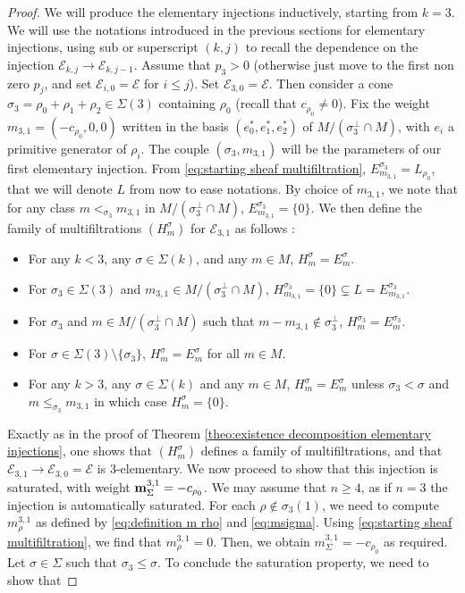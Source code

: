 \documentclass[a4paper,10pt]{amsart}
\theoremstyle{plain}{
    \newtheorem{theorem}{Theorem}[section]
    \newtheorem{lemma}[theorem]{Lemma}
    \newtheorem{corollary}[theorem]{Corollary}
    \newtheorem{proposition}[theorem]{Proposition}
    \newtheorem{conjecture}[theorem]{Conjecture}
}
\theoremstyle{definition}{
    \newtheorem{definition}[theorem]{Definition}
    \newtheorem{defn-thm}[theorem]{Definition-Theorem}
    \newtheorem{example}[theorem]{Example}
    \newtheorem{notation}[theorem]{Notation}
}
\theoremstyle{remark}{
    \newtheorem{remark}[theorem]{Remark}
    \newtheorem{problem}[theorem]{Problem}
    \newtheorem{question}[theorem]{Question}
}
\def\um{{\bf m}}
\def\cE{\mathcal{E}}
\begin{document}
\begin{proof}
We will produce the elementary injections inductively, starting from $k=3$. We will use the notations introduced in the previous sections for elementary injections, using sub or superscript $(k,j)$ to recall the dependence on the injection $\cE_{k,j} \to \cE_{k,j-1}$. Assume that $p_3 > 0$ (otherwise just move to the first non zero $p_j$, and set $\cE_{i,0}=\cE$ for $i\leq j$). Set $\cE_{3,0}=\cE$. Then consider a cone $\sigma_3=\rho_0+\rho_1+\rho_2\in\Sigma(3)$ containing $\rho_0$ (recall that $c_{\rho_0}\neq 0$). Fix the weight $m_{3,1}=(-c_{\rho_0},0,0)$ written in the basis $(e_0^*,e_1^*,e_2^*)$ of $M/(\sigma_3^\perp\cap M)$, with $e_i$ a primitive generator of $\rho_i$. The couple $(\sigma_3,m_{3,1})$ will be the parameters of our first elementary injection. From \eqref{eq:starting sheaf multifiltration}, $E^{\sigma_3}_{m_{3,1}}=L_{\rho_0}$, that we will denote $L$ from now to ease notations. By choice of $m_{3,1}$, we note that for any class $m<_{\sigma_3} m_{3,1}$ in $M/(\sigma_3^\perp\cap M)$, $E^{\sigma_3}_{m_{3,1}}=\lbrace 0\rbrace$. We then define the family of multifiltrations $(H^\sigma_m)$ for $\cE_{3,1}$ as follows :
\begin{itemize}
  \item For any $k<3$, any $\sigma\in\Sigma(k)$, and any $m\in M$, $H^\sigma_m=E^\sigma_m$.
  \item For $\sigma_3\in\Sigma(3)$ and $m_{3,1}\in M/(\sigma_3^\perp\cap M)$, $ H^{\sigma_3}_{m_{3,1}}=\lbrace 0\rbrace\subsetneq L=E^{\sigma_3}_{m_{3,1}}$.
  \item For $\sigma_3$ and $m\in M/(\sigma_3^\perp\cap M)$ such that $m- m_{3,1}\notin \sigma_3^\perp$, $H_m^{\sigma_3}=E_m^{\sigma_3}$.
  \item For $\sigma\in\Sigma(3)\setminus\lbrace \sigma_3\rbrace$,  $H^\sigma_m=E^\sigma_m$ for all $m\in M$. 
  \item For any $k>3$, any $\sigma\in\Sigma(k)$ and any $m\in M$, $H^\sigma_m=E^\sigma_m$ unless $\sigma_3<\sigma$ and $m\leq_{\sigma_3} m_{3,1}$ in which case $H^\sigma_m=\lbrace 0 \rbrace$.
 \end{itemize}
 Exactly as in the proof of Theorem \ref{theo:existence decomposition elementary injections}, one shows that $(H^\sigma_m)$ defines a family of multifiltrations, and that $\cE_{3,1}\to\cE_{3,0}=\cE$ is $3$-elementary. We now proceed to show that this injection is saturated, with weight $\um_\Sigma^{3,1}=-c_{\rho_0}$. We may assume that $n\geq 4$, as if $n=3$ the injection is automatically saturated. For each $\rho\notin\sigma_3(1)$, we need to compute $m_\rho^{3,1}$ as defined by \eqref{eq:definition m rho} and \eqref{eq:msigma}. Using \eqref{eq:starting sheaf multifiltration}, we find that $m_\rho^{3,1}=0$.  Then, we obtain $m_\Sigma^{3,1}=-c_{\rho_0}$ as required. Let $\sigma\in\Sigma$ such that $\sigma_3\leq \sigma$. To conclude the saturation property, we need to show that 

\end{proof}
\end{document}
